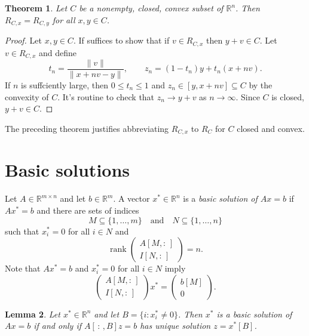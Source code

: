 \documentclass[12pt]{amsart}
\newtheorem{theorem}{Theorem}[section]
\newtheorem{lemma}[theorem]{Lemma}
\theoremstyle{definition}
\theoremstyle{remark}
\numberwithin{equation}{section}
\newcommand{\RR}{\mathbb{R}}
\DeclareMathOperator{\rank}{rank}
\begin{document}
\begin{theorem}
    Let $C$ be a nonempty, closed, convex subset of $\RR^n$.
    Then $R_{C,x}=R_{C,y}$ for all $x,y\in C$.
\end{theorem}

\begin{proof}
    Let $x,y\in C$.
    If suffices to show that if $v\in R_{C,x}$ then $y+v\in C$.
    Let $v\in R_{C,x}$ and define
    \[
        t_n=\frac{\|v\|}{\|x + nv - y\|},\qquad 
        z_n = (1-t_n)y + t_n(x+nv).
    \]
    If $n$ is suffciently large, then $0\leq t_n\leq 1$ and
    $z_n\in [y, x+nv]\subseteq C$ by the convexity of $C$.
    It's routine to check that $z_n\to y+v$ as $n\to\infty$.
    Since $C$ is closed, $y+v\in C$.
\end{proof}

The preceding theorem justifies abbreviating $R_{C,x}$ to $R_C$
for $C$ closed and convex.

\section{Basic solutions}

Let $A\in\RR^{m\times n}$ and let $b\in\RR^m$.
A vector $x^*\in\RR^n$ is a \emph{basic solution of $Ax=b$}
if $Ax^*=b$ and there are sets of indices
\[
    M\subseteq\{1,\ldots,m\}\quad\text{and}\quad
    N\subseteq\{1,\ldots,n\}
\]
such that $x_i^*=0$ for all $i\in N$ and
\[
    \rank\begin{pmatrix}
        A[M,:\,]\\I[N,:\,]
    \end{pmatrix}=n.
\]
Note that $Ax^*=b$ and $x_i^*=0$ for all $i\in N$ imply
\[
    \begin{pmatrix}A[M,:\,]\\I[N,:\,]\end{pmatrix}x^*
    = \begin{pmatrix}b[M]\\0\end{pmatrix}.
\]

\begin{lemma}
    Let $x^*\in\RR^n$ and let $B=\{i : x_i^*\neq 0\}$.
    Then $x^*$ is a basic solution of $Ax=b$ if and only if $A[\,:\,,B]z = b$
    has unique solution $z=x^*[B]$.
\end{lemma}
\end{document}
